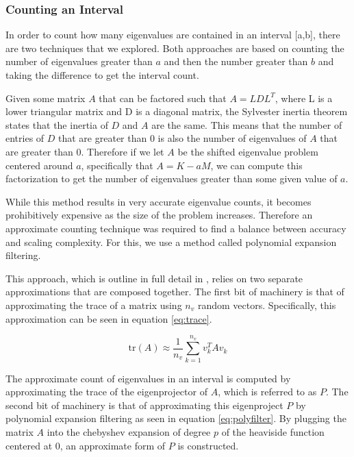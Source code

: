 \subsubsection{Counting an Interval}

In order to count how many eigenvalues are contained in an interval [a,b], there are two techniques that we explored. Both approaches are based on counting the number of eigenvalues greater than $a$ and then the number greater than $b$ and taking the difference to get the interval count. 

Given some matrix $A$ that can be factored such that $A = LDL^T$, where L is a lower triangular matrix and D is a diagonal matrix, the Sylvester inertia theorem states that the inertia of $D$ and $A$ are the same. This means that the number of entries of $D$ that are greater than 0 is also the number of eigenvalues of $A$ that are greater than 0. Therefore if we let $A$ be the shifted eigenvalue problem centered around $a$, specifically that $A = K - aM$, we can compute this factorization to get the number of eigenvalues greater than some given value of $a$.

While this method results in very accurate eigenvalue counts, it becomes prohibitively expensive as the size of the problem increases. Therefore an approximate counting technique was required to find a balance between accuracy and scaling complexity. For this, we use a method called polynomial expansion filtering. 

This approach, which is outline in full detail in \cite{eigcount}, relies on two separate approximations that are composed together. The first bit of machinery is that of approximating the trace of a matrix using $n_v$ random vectors. Specifically, this approximation can be seen in equation \eqref{eq:trace}.

\begin{equation}
\label{eq:trace}
\text{tr}(A) \approx \frac{1}{n_v} \sum_{k=1}^{n_v} v_k^TAv_k
\end{equation}

The approximate count of eigenvalues in an interval is computed by approximating the trace of the eigenprojector of $A$, which is referred to as $P$. The second bit of machinery is that of approximating this eigenproject $P$ by polynomial expansion filtering as seen in equation \eqref{eq:polyfilter}. By plugging the matrix $A$ into the chebyshev expansion of degree $p$ of the heaviside function centered at 0, an approximate form of $P$ is constructed.

